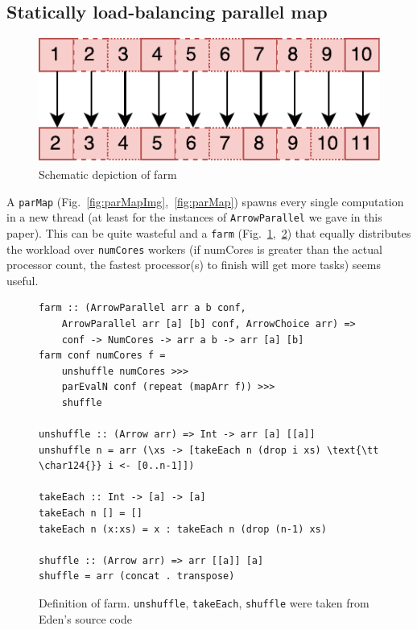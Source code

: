 \documentclass{jfp1}
\renewcommand{\cite}[1]{\citep{#1}}
\newcommand{\inlinecode}[1]{\texttt{#1}}
\begin{document}
\subsection{Statically load-balancing parallel map}
\begin{figure}[h]
	\includegraphics[scale=0.7]{images/farm}
	\caption{Schematic depiction of farm}
	\label{fig:farmImg}
\end{figure}
A \inlinecode{parMap} (Fig.~\ref{fig:parMapImg},~\ref{fig:parMap}) spawns every single computation in a new thread (at least for the instances of \inlinecode{ArrowParallel} we gave in this paper). This can be quite wasteful and a \inlinecode{farm} (Fig.~\ref{fig:farmImg},~\ref{fig:farm}) that equally distributes the workload over \inlinecode{numCores} workers (if numCores is greater than the actual processor count, the fastest processor(s) to finish will get more tasks) seems useful.
\begin{figure}[h]
\begin{lstlisting}[frame=htrbl]
farm :: (ArrowParallel arr a b conf,
	ArrowParallel arr [a] [b] conf, ArrowChoice arr) =>
	conf -> NumCores -> arr a b -> arr [a] [b]
farm conf numCores f =
	unshuffle numCores >>>
	parEvalN conf (repeat (mapArr f)) >>>
	shuffle

unshuffle :: (Arrow arr) => Int -> arr [a] [[a]]
unshuffle n = arr (\xs -> [takeEach n (drop i xs) \text{\tt \char124{}} i <- [0..n-1]])

takeEach :: Int -> [a] -> [a]
takeEach n [] = []
takeEach n (x:xs) = x : takeEach n (drop (n-1) xs)

shuffle :: (Arrow arr) => arr [[a]] [a]
shuffle = arr (concat . transpose)
\end{lstlisting}
\caption{Definition of farm. \inlinecode{unshuffle}, \inlinecode{takeEach}, \inlinecode{shuffle} were taken from Eden's source code \cite{eden_skel_shuffle}}
\label{fig:farm}
\end{figure}
\end{document}
